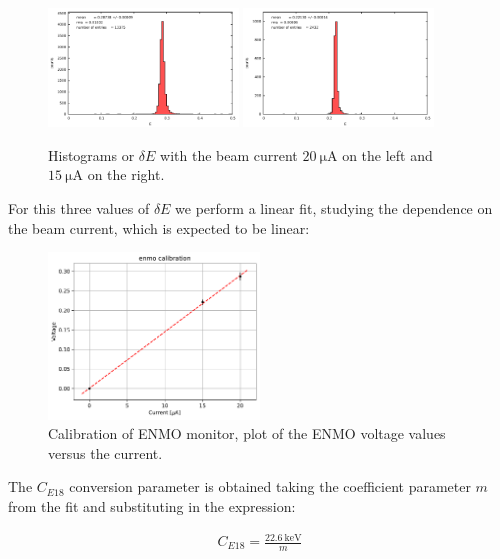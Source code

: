 \begin{figure}[hbtp]
\centering
\includegraphics[width = 0.45\textwidth]{Analysis/ENMOvoltage20.pdf}
\includegraphics[width = 0.45\textwidth]{Analysis/ENMOvoltage15.pdf} 
\caption{Histograms or $\delta E$ with the beam current $\SI{20}{\micro \ampere}$ on the left and $\SI{15}{\micro \ampere}$ on the right.}
\end{figure}

For this three values of $\delta E$ we perform a linear fit, studying the dependence on the beam current, which is expected to be linear:

\begin{figure}[hbtp]
\centering
\includegraphics[width = 0.5\textwidth]{Analysis/Calibrations/E18_Calibration.pdf}
\caption{Calibration of ENMO monitor, plot of the ENMO voltage values versus the current.}
\end{figure}

The $C_{E18}$ conversion parameter is obtained taking the coefficient parameter $m$ from the fit and substituting in the expression:

\begin{align*}
C_{E18} =  \frac{\SI{22.6}{\kilo \electronvolt}}{m}
\end{align*}

